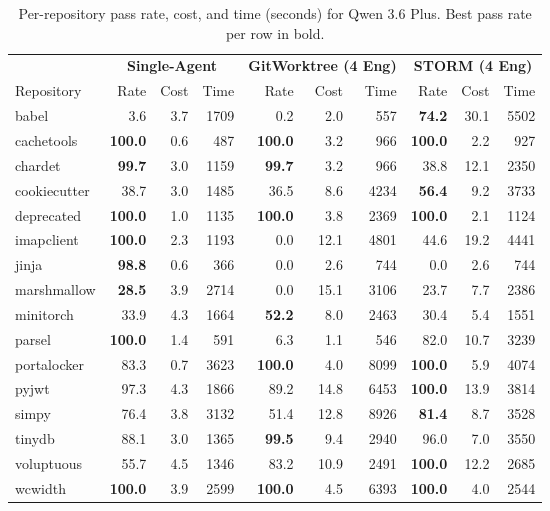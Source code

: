\documentclass{article}
\begin{document}
\begin{table}[t!]
  \caption{Per-repository pass rate, cost, and time (seconds) for Qwen 3.6 Plus. Best pass rate per row in bold.}
  \label{tab:per-repo-qwen36plus}
  \centering
  \small
  \begin{tabular}{l rrr rrr rrr}
    \toprule
    & \multicolumn{3}{c}{\textbf{Single-Agent}} & \multicolumn{3}{c}{\textbf{GitWorktree (4 Eng)}} & \multicolumn{3}{c}{\textbf{STORM (4 Eng)}} \\
    \cmidrule(lr){2-4} \cmidrule(lr){5-7} \cmidrule(lr){8-10}
    Repository & Rate & Cost & Time & Rate & Cost & Time & Rate & Cost & Time \\
    \midrule
    babel        &   3.6 &  3.7 & 1709 &   0.2 &  2.0 &  557 & \textbf{74.2} & 30.1 & 5502 \\
    cachetools   & \textbf{100.0} &  0.6 &  487 & \textbf{100.0} &  3.2 &  966 & \textbf{100.0} &  2.2 &  927 \\
    chardet      & \textbf{99.7} &  3.0 & 1159 & \textbf{99.7} &  3.2 &  966 &  38.8 & 12.1 & 2350 \\
    cookiecutter &  38.7 &  3.0 & 1485 &  36.5 &  8.6 & 4234 & \textbf{56.4} &  9.2 & 3733 \\
    deprecated   & \textbf{100.0} &  1.0 & 1135 & \textbf{100.0} &  3.8 & 2369 & \textbf{100.0} &  2.1 & 1124 \\
    imapclient   & \textbf{100.0} &  2.3 & 1193 &   0.0 & 12.1 & 4801 &  44.6 & 19.2 & 4441 \\
    jinja        & \textbf{98.8} &  0.6 &  366 &   0.0 &  2.6 &  744 &   0.0 &  2.6 &  744 \\
    marshmallow  & \textbf{28.5} &  3.9 & 2714 &   0.0 & 15.1 & 3106 &  23.7 &  7.7 & 2386 \\
    minitorch    &  33.9 &  4.3 & 1664 & \textbf{52.2} &  8.0 & 2463 &  30.4 &  5.4 & 1551 \\
    parsel       & \textbf{100.0} &  1.4 &  591 &   6.3 &  1.1 &  546 &  82.0 & 10.7 & 3239 \\
    portalocker  &  83.3 &  0.7 & 3623 & \textbf{100.0} &  4.0 & 8099 & \textbf{100.0} &  5.9 & 4074 \\
    pyjwt        &  97.3 &  4.3 & 1866 &  89.2 & 14.8 & 6453 & \textbf{100.0} & 13.9 & 3814 \\
    simpy        &  76.4 &  3.8 & 3132 &  51.4 & 12.8 & 8926 & \textbf{81.4} &  8.7 & 3528 \\
    tinydb       &  88.1 &  3.0 & 1365 & \textbf{99.5} &  9.4 & 2940 &  96.0 &  7.0 & 3550 \\
    voluptuous   &  55.7 &  4.5 & 1346 &  83.2 & 10.9 & 2491 & \textbf{100.0} & 12.2 & 2685 \\
    wcwidth      & \textbf{100.0} &  3.9 & 2599 & \textbf{100.0} &  4.5 & 6393 & \textbf{100.0} &  4.0 & 2544 \\
    \bottomrule
  \end{tabular}
\end{table}
\end{document}
